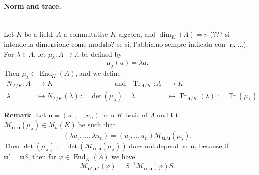 \documentclass[12pt,a4paper]{report}
\theoremstyle{definition}
\theoremstyle{num.custom-title}
\DeclareMathOperator{\rk}{rk}
\DeclareMathOperator{\End}{End}
\DeclareMathOperator{\Tr}{Tr}
\newcommand{\M}{\mathcal{M}}
\renewcommand{\phi}{\varphi}
\renewcommand{\u}{\mathbf{u}}
\begin{document}
\paragraph{Norm and trace.}\ \\
Let $K$ be a field, $A$ a commutative $K$-algebra, and $\dim_K(A)=n$ (??? si intende la dimensione come modulo? se sì, l'abbiamo sempre indicata con $\rk$...). For $\lambda \in A$, let $\mu_\lambda : A \to A$ be defined by
\[
\mu_\lambda(a) = \lambda a.
\]
Then $\mu_\lambda \in \End_K(A)$, and we define
\begin{align*}
N_{A/K} \colon A &\to K \quad \quad \quad \quad \quad \quad \quad \quad \quad \text{and}  &\Tr_{A/K} \colon A &\to K \\
\lambda &\mapsto N_{A/K}(\lambda) := \det(\mu_\lambda)    &\lambda &\mapsto \Tr_{A/K}(\lambda) := \Tr(\mu_\lambda)
\end{align*}

\noindent\textbf{Remark.} Let $\u = (u_1,...,u_n)$ be a $K$-basis of $A$ and let $\M_{\u,\u}(\mu_\lambda) \in M_n(K)$ be such that
\[
(\lambda u_1, ..., \lambda u_n) = (u_1,..,u_n) \M_{\u,\u}(\mu_\lambda).
\]
Then $\det(\mu_\lambda) := \det(\M_{\u,\u}(\mu_\lambda))$ does not depend on $\u$, because if $\u'=\u S$, then for $\phi \in \End_K(A)$ we have
\[
\M_{\u',\u'}(\phi) = S^{-1} \M_{\u,\u}(\phi) S.
\]
\end{document}
